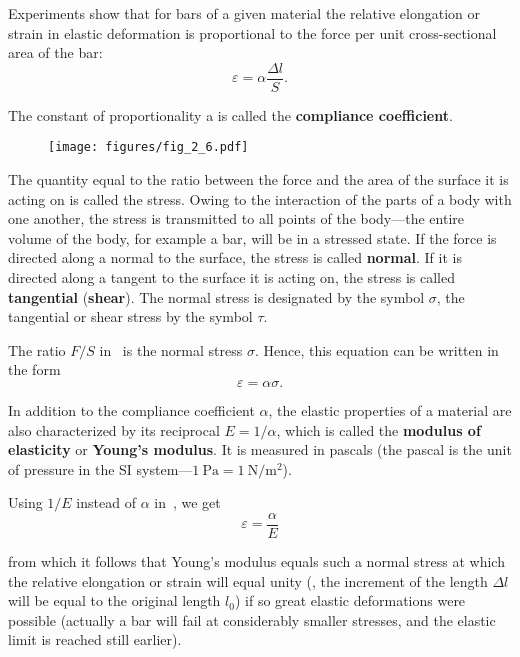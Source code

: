 Experiments show that for bars of a given material the relative elongation or strain in elastic deformation is proportional to the force per unit cross-sectional area of the bar:
\begin{equation}\label{eq:2_28}
\varepsilon = \alpha\frac{\Delta l}{S}.
\end{equation}

\noindent
The constant of proportionality a is called the \textbf{compliance coefficient}.

\begin{figure}[t]
	\begin{center}
		\texttt{[image: figures/fig\_2\_6.pdf]}
		\caption[]{}
		\label{fig:2_6}
	\end{center}
	\vspace{-0.7cm}
\end{figure}

The quantity equal to the ratio between the force and the area of the surface it is acting on is called the stress. Owing to the interaction of the parts of a body with one another, the stress is transmitted to all points of the body---the entire volume of the body, for example a bar, will be in a stressed state. If the force is directed along a normal to the surface, the stress is called \textbf{normal}. If it is directed along a tangent to the surface it is acting on, the stress is called \textbf{tangential} (\textbf{shear}). The normal stress is designated by the symbol $\sigma$, the tangential or shear stress by the symbol $\tau$.

The ratio $F/S$ in~ is the normal stress $\sigma$. Hence, this equation can be written in the form
\begin{equation}\label{eq:2_29}
\varepsilon = \alpha\sigma.
\end{equation}

\noindent
In addition to the compliance coefficient $\alpha$, the elastic properties of a material are also characterized by its reciprocal $E=1/\alpha$, which is called the \textbf{modulus of elasticity} or \textbf{Young's modulus}. It is measured in pascals (the pascal is the unit of pressure in the SI system---$\SI{1}{\pascal}=\SI{1}{\newton\per\square\metre}$).

Using $1/E$ instead of $\alpha$ in~, we get
\begin{equation}\label{eq:2_30}
\varepsilon = \frac{\alpha}{E}
\end{equation}

\noindent
from which it follows that Young's modulus equals such a normal stress at which the relative elongation or strain will equal unity (\ie, the increment of the length $\Delta l$ will be equal to the original length $l_0$) if so great elastic deformations were possible (actually a bar will fail at considerably smaller stresses, and the elastic limit is reached still earlier).

